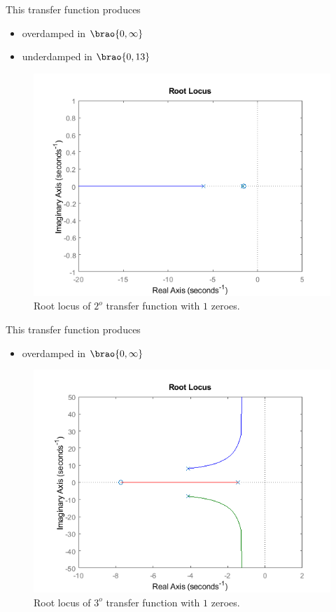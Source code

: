 \documentclass[12pt]{article}
\DeclarePairedDelimiter\brao()%
\begin{document}
This transfer function produces
\begin{itemize}
    \item overdamped in $\brao{0, \infty}$
    \item underdamped in $\brao{0, 13}$
\end{itemize}

\begin{figure}
    \centering
    \includegraphics[width=\linewidth]{img/task05_110_rlocus.png}
    \caption{Root locus of $2^o$ transfer function with $1$ zeroes.}
    \label{fig:task rlocus 2o/1}
\end{figure}

This transfer function produces
\begin{itemize}
    \item overdamped in $\brao{0, \infty}$
\end{itemize}

\begin{figure}
    \centering
    \includegraphics[width=\linewidth]{img/task06_110_rlocus.png}
    \caption{Root locus of $3^o$ transfer function with $1$ zeroes.}
    \label{fig:task rlocus 3o/1}
\end{figure}
\end{document}
